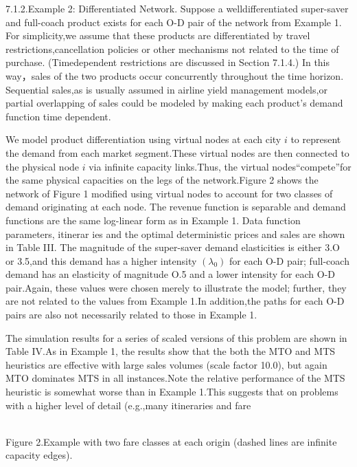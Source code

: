 7.1.2.Example 2: Differentiated Network. Suppose a welldifferentiated
super-saver and full-coach product exists for each O-D pair of the
network from Example 1. For simplicity,we assume that these products are
differentiated by travel restrictions,cancellation policies or other
mechanisms not related to the time of purchase. (Timedependent
restrictions are discussed in Section 7.1.4.) In this way，sales of the
two products occur concurrently throughout the time horizon. Sequential
sales,as is usually assumed in airline yield management models,or
partial overlapping of sales could be modeled by making each product's
demand function time dependent.

We model product differentiation using virtual nodes at each city \(i\)
to represent the demand from each market segment.These virtual nodes are
then connected to the physical node \(i\) via infinite capacity
links.Thus, the virtual nodes``compete''for the same physical capacities
on the legs of the network.Figure 2 shows the network of Figure 1
modified using virtual nodes to account for two classes of demand
originating at each node. The revenue function is separable and demand
functions are the same log-linear form as in Example 1. Data function
parameters, itinerar ies and the optimal deterministic prices and sales
are shown in Table III. The magnitude of the super-saver demand
elasticities is either 3.O or 3.5,and this demand has a higher intensity
\(\left( \lambda _ { 0 } \right)\) for each O-D pair; full-coach demand
has an elasticity of magnitude O.5 and a lower intensity for each O-D
pair.Again, these values were chosen merely to illustrate the model;
further, they are not related to the values from Example 1.In
addition,the paths for each O-D pairs are also not necessarily related
to those in Example 1.

The simulation results for a series of scaled versions of this problem
are shown in Table IV.As in Example 1, the results show that the both
the MTO and MTS heuristics are effective with large sales volumes (scale
factor 10.0), but again MTO dominates MTS in all instances.Note the
relative performance of the MTS heuristic is somewhat worse than in
Example 1.This suggests that on problems with a higher level of detail
(e.g.,many itineraries and fare

\\
Figure 2.Example with two fare classes at each origin (dashed lines are
infinite capacity edges).

